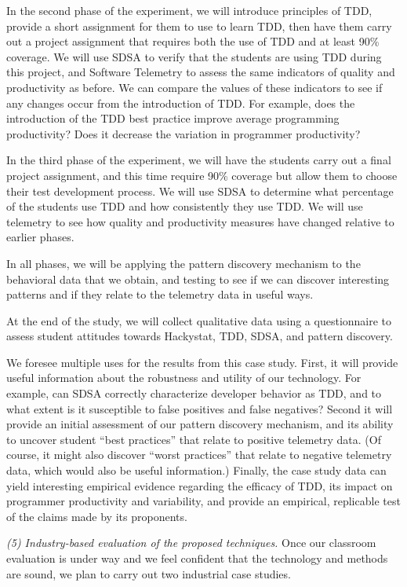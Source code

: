 In the second phase of the experiment, we will introduce principles of TDD,
provide a short assignment for them to use to learn TDD, then have them
carry out a project assignment that requires both the use of TDD and at
least 90\% coverage. We will use SDSA to verify that the students are using
TDD during this project, and Software Telemetry to assess the same
indicators of quality and productivity as before.  We can compare the
values of these indicators to see if any changes occur from the
introduction of TDD. For example, does the introduction of the TDD best
practice improve average programming productivity?  Does it decrease the
variation in programmer productivity?

In the third phase of the experiment, we will have the students carry out a
final project assignment, and this time require 90\% coverage but allow
them to choose their test development process.  We will use SDSA to
determine what percentage of the students use TDD and how consistently they
use TDD. We will use telemetry to see how quality and productivity measures
have changed relative to earlier phases.

In all phases, we will be applying the pattern discovery mechanism to the 
behavioral data that we obtain, and testing to see if we can discover interesting
patterns and if they relate to the telemetry data in useful ways.  

At the end of the study, we will collect qualitative data using a questionnaire to
assess student attitudes towards Hackystat, TDD, SDSA, and pattern discovery. 

We foresee multiple uses for the results from this case study.  First, it
will provide useful information about the robustness and utility of our
technology. For example, can SDSA correctly characterize developer behavior
as TDD, and to what extent is it susceptible to false positives and false
negatives? Second it will provide an initial assessment of our pattern
discovery mechanism, and its ability to uncover student ``best practices''
that relate to positive telemetry data. (Of course, it might also discover
``worst practices'' that relate to negative telemetry data, which would
also be useful information.)  Finally, the case study data can yield
interesting empirical evidence regarding the efficacy of TDD, its impact on programmer
productivity and variability, and provide
an empirical, replicable test of the claims made by its proponents.

{\em (5) Industry-based evaluation of the proposed techniques.}  Once our
classroom evaluation is under way and we feel confident that the technology
and methods are sound, we plan to carry out two industrial case studies.


